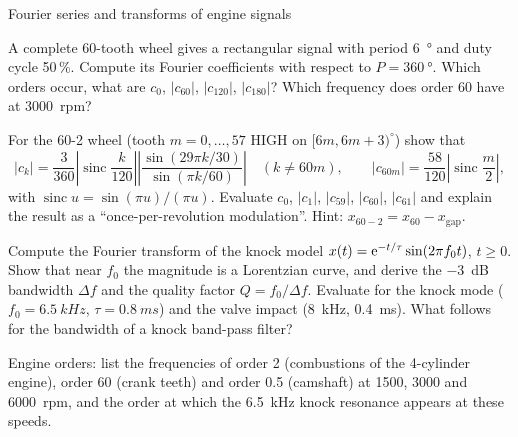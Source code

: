 \begin{exercise}{Fourier series and transforms of engine signals}{\Paper}
\begin{tasks}
  \item A complete 60-tooth wheel gives a rectangular signal with period
    \SI{6}{\degree} and duty cycle 50\,\%. Compute its Fourier coefficients
    with respect to $P=\SI{360}{\degree}$. Which orders occur, what are
    $c_0$, $|c_{60}|$, $|c_{120}|$, $|c_{180}|$? Which frequency does order 60
    have at \SI{3000}{rpm}?
  \item For the 60-2 wheel (tooth $m=0,\dots,57$ HIGH on
    $[6m,6m+3)^\circ$) show that
    \[
    |c_k|=\frac{3}{360}\left|\operatorname{sinc}\frac{k}{120}\right|
      \left|\frac{\sin(29\pi k/30)}{\sin(\pi k/60)}\right|
    \quad(k\ne60m),\qquad
    |c_{60m}|=\frac{58}{120}\left|\operatorname{sinc}\frac{m}{2}\right|,
    \]
    with $\operatorname{sinc}u=\sin(\pi u)/(\pi u)$. Evaluate $c_0$,
    $|c_1|$, $|c_{59}|$, $|c_{60}|$, $|c_{61}|$ and explain the result as a
    ``once-per-revolution modulation''. Hint: $x_{60-2}=x_{60}-x_\mathrm{gap}$.
  \item Compute the Fourier transform of the knock model
    $x(t)=\mathrm{e}^{-t/\tau}\sin(2\pi f_0t)$, $t\ge0$. Show that near $f_0$ the
    magnitude is a Lorentzian curve, and derive the \SI{-3}{dB} bandwidth
    $\Delta f$ and the quality factor $Q=f_0/\Delta f$. Evaluate for the knock
    mode ($f_0=\SI{6.5}{kHz}$, $\tau=\SI{0.8}{ms}$) and the valve impact
    (\SI{8}{kHz}, \SI{0.4}{ms}). What follows for the bandwidth of a knock
    band-pass filter?
  \item Engine orders: list the frequencies of order 2 (combustions of the
    4-cylinder engine), order 60 (crank teeth) and order 0.5 (camshaft) at
    1500, 3000 and \SI{6000}{rpm}, and the order at which the \SI{6.5}{kHz}
    knock resonance appears at these speeds.
\end{tasks}
\end{exercise}

